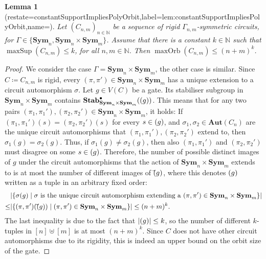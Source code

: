 \documentclass[11pt, DIV=15]{scrarticle}
\theoremstyle{definition}
\theoremstyle{plain}
\newtheorem{lemma}[definition]{Lemma}
\theoremstyle{remark}
\newcommand{\Aut}{\mathbf{Aut}}
\newcommand{\Sym}{\mathbf{Sym}}
\newcommand{\Stab}{\mathbf{Stab}}
\newcommand{\StabP}{\Stab^{\bullet}}
\newcommand{\bbN}{\mathbb{N}}
\let\sup\relax
\DeclareMathOperator{\sup}{sup}
\DeclareMathOperator{\maxOrb}{maxOrb}
\DeclareMathOperator{\maxSup}{maxSup}
\begin{document}
\begin{lemma}[restate=constantSupportImpliesPolyOrbit,label=lem:constantSupportImpliesPolyOrbit,name=]
	\label{lem:constantSupportImpliesPolyOrbit}
	Let $(C_{n,m})_{n \in \bbN}$ be a sequence of rigid $\Gamma_{n,m}$-symmetric circuits, for $\Gamma \in \{\Sym_n, \Sym_n \times \Sym_m\}$. Assume that there is a constant $k \in \bbN$ such that $\maxSup(C_{n,m}) \leq k$, for all $n,m \in \bbN$.
	Then $\maxOrb(C_{n,m}) \leq (n+m)^k$.
\end{lemma}
\begin{proof}		
	We consider the case $\Gamma = \Sym_n \times \Sym_m$, the other case is similar.
	Since $C \coloneqq C_{n,m}$ is rigid, every $(\pi, \pi') \in \Sym_n \times \Sym_m$ has a unique extension to a circuit automorphism $\sigma$. 
	Let $g \in V(C)$ be a gate. Its stabiliser subgroup in $\Sym_n \times \Sym_m$ contains $\StabP
	_{\Sym_n \times \Sym_m}(\sup(g))$. 
	This means that for any two pairs $(\pi_1, \pi_1'), (\pi_2, \pi_2') \in \Sym_n \times \Sym_m$, it holds: If $(\pi_1, \pi_1')(s) = (\pi_2, \pi_2')(s)$ for every $s \in \sup(g)$, and $\sigma_1, \sigma_2 \in \Aut(C_n)$ are the unique circuit automorphisms that $(\pi_1, \pi_1'), (\pi_2, \pi_2')$ extend to, then $\sigma_1(g) = \sigma_2(g)$. Thus, if $\sigma_1(g) \neq \sigma_2(g)$, then also $(\pi_1, \pi_1')$ and $(\pi_2, \pi_2')$ must disagree on some $s \in \sup(g)$. 
	Therefore, the number of possible distinct images of $g$ under the circuit automorphisms that the action of $\Sym_n \times \Sym_m$ extends to is at most the number of different images of $\vec{\sup}(g)$, where this denotes $\sup(g)$ written as a tuple in an arbitrary fixed order:
	\begin{align*}
		&|\{ \sigma(g) \mid \sigma \text{ is the unique circuit automorphism extending a } (\pi, \pi') \in \Sym_n \times \Sym_m   \}|\\
		\leq
		&|\{ (\pi, \pi')(\vec{\sup}(g)) \mid (\pi, \pi') \in \Sym_n \times \Sym_m   \}| \leq (n+m)^k.
	\end{align*}
	The last inequality is due to the fact that $|\sup(g)| \leq k$, so the number of different $k$-tuples in $[n] \uplus [m]$ is at most $(n+m)^k$.
	Since $C$ does not have other circuit automorphisms due to its rigidity, this is indeed an upper bound on the orbit size of the gate.
\end{proof}
\end{document}
